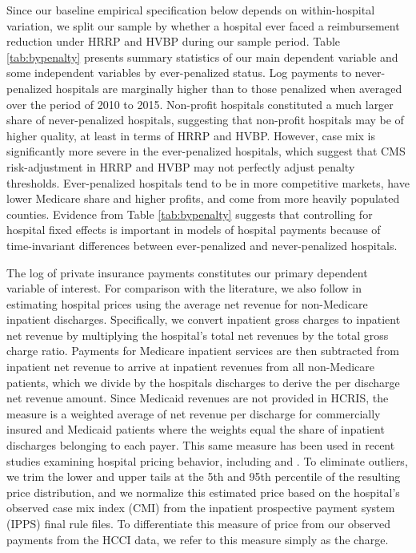 \documentclass[12pt]{article}
\begin{document}
Since our baseline empirical specification below depends on within-hospital variation, we split our sample by whether a hospital ever faced a reimbursement reduction under HRRP and HVBP during our sample period.  Table \ref{tab:bypenalty} presents summary statistics of our main dependent variable and some independent variables by ever-penalized status.  Log payments to never-penalized hospitals are marginally higher than to those penalized when averaged over the period of 2010 to 2015.  Non-profit hospitals constituted a much larger share of never-penalized hospitals, suggesting that non-profit hospitals may be of higher quality, at least in terms of HRRP and HVBP.  However, case mix is significantly more severe in the ever-penalized hospitals, which suggest that CMS risk-adjustment in HRRP and HVBP may not perfectly adjust penalty thresholds.  Ever-penalized hospitals tend to be in more competitive markets, have lower Medicare share and higher profits, and come from more heavily populated counties.  Evidence from Table \ref{tab:bypenalty} suggests that controlling for hospital fixed effects is important in models of hospital payments because of time-invariant differences between ever-penalized and never-penalized hospitals.

The log of private insurance payments constitutes our primary dependent variable of interest. For comparison with the literature, we also follow \cite{dafny2009} in estimating hospital prices using the average net revenue for non-Medicare inpatient discharges. Specifically, we convert inpatient gross charges to inpatient net revenue by multiplying the hospital's total net revenues by the total gross charge ratio. Payments for Medicare inpatient services are then subtracted from inpatient net revenue to arrive at inpatient revenues from all non-Medicare patients, which we divide by the hospitals discharges to derive the per discharge net revenue amount. Since Medicaid revenues are not provided in HCRIS, the measure is a weighted average of net revenue per discharge for commercially insured and Medicaid patients where the weights equal the share of inpatient discharges belonging to each payer. This same measure has been used in recent studies examining hospital pricing behavior, including \cite{schmitt2017} and \cite{lewis2015}. To eliminate outliers, we trim the lower and upper tails at the 5th and 95th percentile of the resulting price distribution, and we normalize this estimated price based on the hospital's observed case mix index (CMI) from the inpatient prospective payment system (IPPS) final rule files. To differentiate this measure of price from our observed payments from the HCCI data, we refer to this measure simply as the charge.
\end{document}
